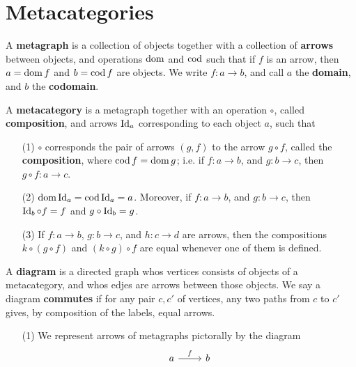 \section{Metacategories}

\begin{definition}
    A \textbf{metagraph} is a collection of objects together with a collection
    of \textbf{arrows} between objects, and operations $\operatorname{dom}$ and  $\operatorname{cod}$ such
    that if  $f$ is an arrow, then $a=\operatorname{dom}{f}$ and $b=\operatorname{cod}{f}$ are objects. We
    write $f:a \xrightarrow{} b$, and call $a$ the  \textbf{domain}, and $b$ the
     \textbf{codomain}.

\begin{definition}
    A \textbf{metacategory} is a metagraph together with an operation $\circ$,
    called \textbf{composition}, and arrows $\operatorname{Id}_a$ corresponding to each object
    $a$, such that
    \begin{enumerate}
        \item[(1)] $\circ$ corresponds the pair of arrows $(g,f)$ to the arrow
            $g \circ f$, called the  \textbf{composition}, where
            $\operatorname{cod}{f}=\operatorname{dom}{g}$; i.e. if $f:a \xrightarrow{} b$, and $g:b
            \xrightarrow{} c$, then $g \circ f:a \xrightarrow{} c$.

        \item[(2)] $\operatorname{dom}{\operatorname{Id}_a}=\operatorname{cod}{\operatorname{Id}_a}=a$. Moreover, if $f:a \xrightarrow{}
            b$, and $g:b \xrightarrow{} c$, then $\operatorname{Id}_b \circ f=f$ and  $g \circ
            \operatorname{Id}_b=g$.

        \item[(3)] If $f:a \xrightarrow{} b$, $g:b \xrightarrow{} c$, and $h:c
            \xrightarrow{} d$ are arrows, then the compositions $k \circ (g
            \circ f)$ and $(k \circ g) \circ f$ are equal whenever one of them
            is defined.
    \end{enumerate}
\end{definition}

\begin{definition}
    A \textbf{diagram} is a directed graph whos vertices consists of objects of
    a metacategory, and whos edjes are arrows between those objects. We say a
    diagram \textbf{commutes} if for any pair $c,c'$ of vertices, any two paths
    from  $c$ to  $c'$ gives, by composition of the labels, equal arrows.
\end{definition}

\begin{example}\label{example_1.1}
    \begin{enumerate}
        \item[(1)] We represent arrows of metagraphs pictorally by the diagram
                 \[\begin{tikzcd}
                        a & b
                        \arrow["f", from=1-1, to=1-2]
                    \end{tikzcd}\]


\end{enumerate}
\end{example}
\end{definition}
